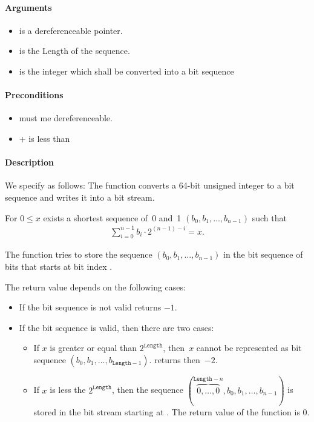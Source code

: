 \paragraph{Arguments}

\begin{itemize}
   \item  {} is a dereferenceable pointer.
   \item {} is the Length of the sequence.
   \item {} is the integer which shall be converted into a bit sequence
\end{itemize}

\paragraph{Preconditions}
\begin{itemize}
    \item  {} must me dereferenceable.
    \item {} +  is less than 
\end{itemize}

\paragraph{Description}

We specify \pokenext as follows:
The function \poke converts a 64-bit unsigned integer to a bit sequence and 
writes it into a bit stream.

For $0 \leq x$ exists a shortest sequence of~0 and~1
$(b_0, b_1,\ldots,b_{n - 1})$
such that
\begin{align}
    \sum_{i=0}^{n-1} b_i \cdot 2^{(n - 1) - i} = x.
\end{align}

The function \pokenext tries to store the sequence $(b_0, b_1,\ldots,b_{n - 1})$
in the bit sequence of  bits that starts
at bit index .

The return value depends on  the following cases:
\begin{itemize}
    \item  If the bit sequence is not valid \peeknext  returns $-1$.
    \item  If the bit sequence is valid, then there are two cases:
\begin{itemize}
\item
If $x$ is greater or equal than $2^\mathtt{Length}$, then~$x$
cannot be represented as bit sequence $(b_0, b_1,\ldots,b_{\mathtt{Length} - 1})$.
\pokenext returns then~$-2$.

\item
If $x$ is less the $2^{\mathtt{Length}}$, then  the sequence
$(\overbrace{0,\ldots,0}^{\mathtt{Length}-n},b_0, b_1,\ldots,b_{n - 1})$
is stored in the bit stream starting at .
The return value of the function \pokenext is 0.

\end{itemize}
\end{itemize}

